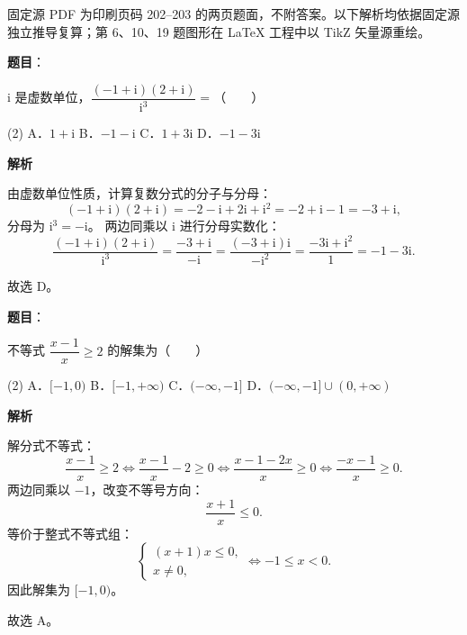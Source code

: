 

\begin{gktip}
固定源 PDF 为印刷页码 202–203 的两页题面，不附答案。以下解析均依据固定源独立推导复算；第 6、10、19 题图形在 LaTeX 工程中以 TikZ 矢量源重绘。
\end{gktip}

\begin{answer}

\textbf{题目}：

$\mathrm{i}$ 是虚数单位，$\dfrac{(-1 + \mathrm{i})(2 + \mathrm{i})}{\mathrm{i}^3} =$\mbox{（　　）}

\begin{gkopts}(2)
\task A．$1 + \mathrm{i}$
\task B．$-1 - \mathrm{i}$
\task C．$1 + 3\mathrm{i}$
\task D．$-1 - 3\mathrm{i}$
\end{gkopts}

\textbf{解析}

由虚数单位性质，计算复数分式的分子与分母：
\nopagebreak[4]
\[
(-1 + \mathrm{i})(2 + \mathrm{i}) = -2 - \mathrm{i} + 2\mathrm{i} + \mathrm{i}^2 = -2 + \mathrm{i} - 1 = -3 + \mathrm{i},
\]
分母为 $\mathrm{i}^3 = -\mathrm{i}$。
两边同乘以 $\mathrm{i}$ 进行分母实数化：
\nopagebreak[4]
\[
\dfrac{(-1 + \mathrm{i})(2 + \mathrm{i})}{\mathrm{i}^3} = \dfrac{-3 + \mathrm{i}}{-\mathrm{i}} = \dfrac{(-3 + \mathrm{i})\mathrm{i}}{-\mathrm{i}^2} = \dfrac{-3\mathrm{i} + \mathrm{i}^2}{1} = -1 - 3\mathrm{i}.
\]

故选 D。


\end{answer}
\begin{answer}

\textbf{题目}：

不等式 $\dfrac{x-1}{x} \ge 2$ 的解集为\mbox{（　　）}

\begin{gkopts}(2)
\task A．$[-1, 0)$
\task B．$[-1, +\infty)$
\task C．$(-\infty, -1]$
\task D．$(-\infty, -1] \cup (0, +\infty)$
\end{gkopts}

\textbf{解析}

解分式不等式：
\nopagebreak[4]
\[
\dfrac{x-1}{x} \ge 2 \iff \dfrac{x-1}{x} - 2 \ge 0 \iff \dfrac{x-1-2x}{x} \ge 0 \iff \dfrac{-x-1}{x} \ge 0.
\]
两边同乘以 $-1$，改变不等号方向：
\nopagebreak[4]
\[
\dfrac{x+1}{x} \le 0.
\]
等价于整式不等式组：
\nopagebreak[4]
\[
\begin{cases}
(x+1)x \le 0, \\
x \neq 0,
\end{cases}
\iff -1 \le x < 0.
\]
因此解集为 $[-1, 0)$。

故选 A。


\end{answer}
